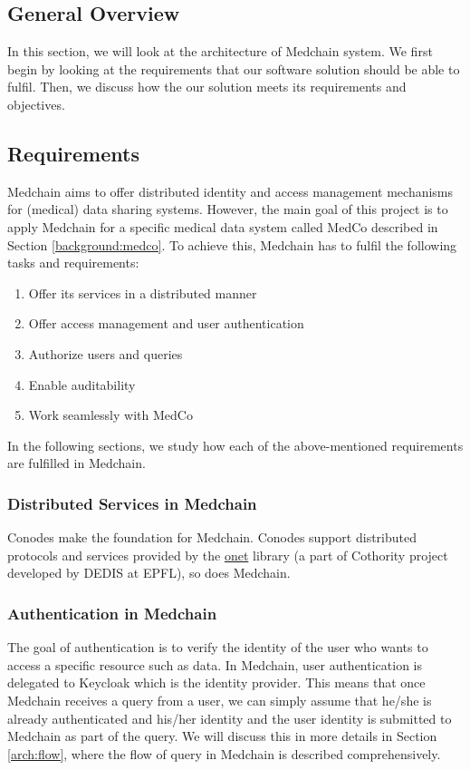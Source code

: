 \subsection{General Overview} \label{arch:general Overview}
In this section, we will look at the architecture of Medchain system. We first begin by looking at the requirements that our software solution should be able to fulfil. Then, we discuss how the our solution meets its requirements and objectives. 

\subsection{Requirements} \label{arch:requirements}
Medchain aims to offer distributed identity and access management mechanisms for (medical) data sharing systems. However, the main goal of this project is to apply Medchain for a specific medical data system called MedCo described in Section \ref{background:medco}. To achieve this, Medchain has to fulfil the following tasks and requirements:
\begin{enumerate}
    \item Offer its services in a distributed manner 
    \item Offer access management and user authentication 
    \item Authorize users and queries
    \item Enable auditability 
    \item Work seamlessly with MedCo
\end{enumerate}
In the following sections, we study how each of the above-mentioned requirements are fulfilled in Medchain. 

\subsubsection{Distributed Services in Medchain} \label{arch:distributed}
Conodes make the foundation for Medchain. Conodes support distributed protocols and services provided by the \href{https://github.com/dedis/onet/blob/master/README.md}{onet} library (a part of Cothority project developed by DEDIS at EPFL), so does Medchain. 

\subsubsection{Authentication in Medchain}\label{arch:authentication}
The goal of authentication is to verify the identity of the user who wants to access a specific resource such as data. In Medchain, user authentication is delegated to Keycloak \cite{keycloak:2019} which is the identity provider. This means that once Medchain receives a query from a user, we can simply assume that he/she is already authenticated and his/her identity and the user identity is submitted to Medchain as part of the query. We will discuss this in more details in Section \ref{arch:flow}, where the flow of query in Medchain is described comprehensively.

